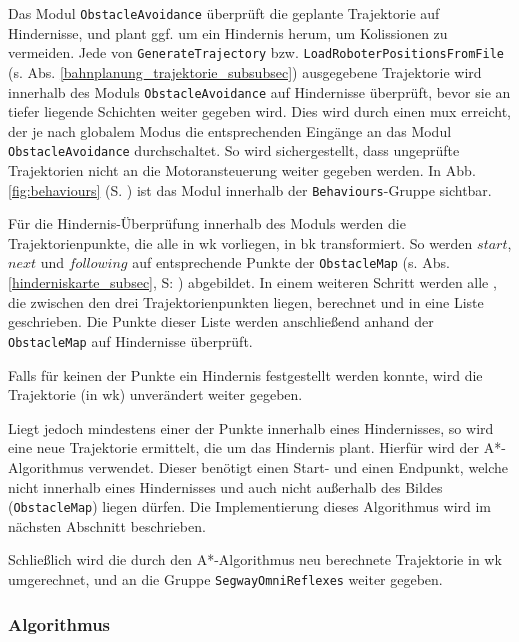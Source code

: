 Das Modul \lstinline{ObstacleAvoidance} überprüft die geplante Trajektorie auf Hindernisse, und plant ggf. um ein Hindernis herum, um Kolissionen zu vermeiden.
Jede von \lstinline{GenerateTrajectory} bzw. \lstinline{LoadRoboterPositionsFromFile} (s. Abs. \ref{bahnplanung_trajektorie_subsubsec}) ausgegebene Trajektorie wird innerhalb des Moduls \lstinline{ObstacleAvoidance} auf Hindernisse überprüft, bevor sie an tiefer liegende Schichten weiter gegeben wird.
Dies wird durch einen \gls{mux} erreicht, der je nach globalem Modus die entsprechenden Eingänge an das Modul \lstinline{ObstacleAvoidance} durchschaltet.
So wird sichergestellt, dass ungeprüfte Trajektorien nicht an die Motoransteuerung weiter gegeben werden.
In Abb. \ref{fig:behaviours} (S. \pageref{fig:behaviours}) ist das Modul innerhalb der \lstinline{Behaviours}-Gruppe sichtbar.

Für die Hindernis-Überprüfung innerhalb des Moduls werden die Trajektorienpunkte, die alle in \gls{wk} vorliegen, in \gls{bk} transformiert.
So werden $start$, $next$ und $following$ auf entsprechende Punkte der \lstinline{ObstacleMap} (s. Abs. \ref{hinderniskarte_subsec}, S: \pageref{hinderniskarte_subsec}) abgebildet.
In einem weiteren Schritt werden alle , die zwischen den drei Trajektorienpunkten liegen, berechnet und in eine Liste geschrieben.
Die Punkte dieser Liste werden anschließend anhand der \lstinline{ObstacleMap} auf Hindernisse überprüft.

Falls für keinen der Punkte ein Hindernis festgestellt werden konnte, wird die Trajektorie (in \gls{wk}) unverändert weiter gegeben.

Liegt jedoch mindestens einer der Punkte innerhalb eines Hindernisses, so wird eine neue Trajektorie ermittelt, die um das Hindernis plant.
Hierfür wird der A*-Algorithmus verwendet.
Dieser benötigt einen Start- und einen Endpunkt, welche nicht innerhalb eines Hindernisses und auch nicht außerhalb des Bildes (\lstinline{ObstacleMap}) liegen dürfen.
Die Implementierung dieses Algorithmus wird im nächsten Abschnitt beschrieben.

Schließlich wird die durch den A*-Algorithmus neu berechnete Trajektorie in \gls{wk} umgerechnet, und an die Gruppe \lstinline{SegwayOmniReflexes} weiter gegeben.

\subsubsection{Algorithmus}
\authorsection{\editorjulian}

